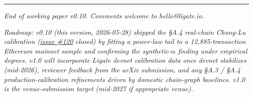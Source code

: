 \documentclass[
  11pt,
]{article}
\begin{document}
\begin{center}\rule{0.5\linewidth}{0.5pt}\end{center}

\emph{End of working paper v0.10. Comments welcome to hello@ligate.io.}

\emph{Roadmap: v0.10 (this version, 2026-05-28) shipped the §A.4
real-chain Chung-Lu calibration
(\href{https://github.com/ligate-io/ligate-research/issues/120}{issue
\#120} closed) by fitting a power-law tail to a 12,885-transaction
Ethereum mainnet sample and confirming the synthetic-$\alpha$ finding
under empirical degrees. v1.0 will incorporate Ligate devnet calibration
data once devnet stabilizes (mid-2026), reviewer feedback from the arXiv
submission, and any §A.3 / §A.4 production-calibration refinements
driven by domestic chain-graph baselines. v1.0 is the venue-submission
target (mid-2027 if appropriate
venue).}
\end{document}
